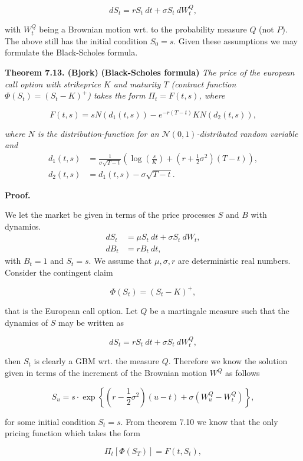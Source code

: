 \documentclass[a4paper,12pt,openany]{book}
\begin{document}
\[
dS_t=r S_t\ dt+\sigma S_t\ dW^Q_t,\tag{7.47}
\]

with \(W_t^Q\) being a Brownian motion wrt. to the probability measure \(Q\) (not \(P\)). The above still has the initial condition \(S_0=s\). Given these assumptions we may formulate the Black-Scholes formula.

\textbf{Theorem 7.13. (Bjork)} \textbf{(Black-Scholes formula)} \emph{The price of the european call option with strikeprice \(K\) and maturity \(T\) (contract function \(\Phi(S_t)=\left( S_t - K\right)^+\)) takes the form \(\Pi_t=F(t,s)\), where}

\[
F(t,s)=s N(d_1(t,s))-e^{-r(T-t)}KN(d_2(t,s)),\tag{7.52}
\]

\emph{where \(N\) is the distribution-function for an \(\mathcal{N}(0,1)\)-distributed random variable and}
\begin{align*}
d_1(t,s)&=\frac{1}{\sigma \sqrt{T-t}}\left(\log\left(\frac{s}{K}\right)+\left(r+\frac{1}{2}\sigma^2\right)(T-t)\right),\tag{7.53}\\
d_2(t,s)&=d_1(t,s)-\sigma\sqrt{T-t}.\tag{7.54}
\end{align*}

\textbf{Proof.}

We let the market be given in terms of the price processes \(S\) and \(B\) with dynamics.
\begin{align*}
dS_t&=\mu S_t\ dt+\sigma S_t\ dW_t,\\
dB_t&=r B_t\ dt,
\end{align*}
with \(B_t=1\) and \(S_t=s\). We assume that \(\mu,\sigma, r\) are deterministic real numbers. Consider the contingent claim

\[
\Phi(S_t)=\left( S_t - K\right)^+,
\]

that is the European call option. Let \(Q\) be a martingale measure such that the dynamics of \(S\) may be written as

\[
dS_t=r S_t\ dt+\sigma S_t\ dW^Q_t,
\]

then \(S_t\) is clearly a GBM wrt. the measure \(Q\). Therefore we know the solution given in terms of the increment of the Brownian motion \(W^Q\) as follows

\[
S_u=s\cdot \exp\left\{\left(r-\frac{1}{2}\sigma^2\right)(u-t)+\sigma\left(W_u^Q-W_t^Q\right)\right\},
\]

for some initial condition \(S_t=s\). From theorem 7.10 we know that the only pricing function which takes the form

\[
\Pi_t[\Phi(S_T)]=F(t,S_t),
\]
\end{document}
